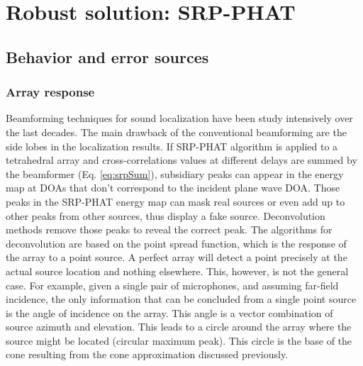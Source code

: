 \section{Robust solution: SRP-PHAT}
\subsection{Behavior and error sources}
\subsubsection{Array response}
Beamforming techniques for sound localization have been study intensively over the last decades. The main drawback of the conventional beamforming are the side lobes in the localization results. If SRP-PHAT algorithm is applied to a tetrahedral array and cross-correlations values at different delays are summed by the beamformer (Eq. \ref{eq:srpSum}), subsidiary peaks can appear in the energy map at DOAs that don't correspond to the incident plane wave DOA. Those peaks in the SRP-PHAT energy map can mask real sources or even add up to other peaks from other sources, thus display a fake source. Deconvolution methods remove those peaks to reveal the correct peak. The algorithms for deconvolution are based on the point spread function, which is the response of the array to a point source. 
A perfect array will detect a point precisely at the actual source location and nothing elsewhere. This, however, is not the general case. For example, given a single pair of microphones, and assuming far-field incidence, the only information that can be concluded from a single point source is the angle of incidence on the array. This angle is a vector combination of source azimuth and elevation. This leads to a circle around the array where the source might be located (circular maximum peak). This circle is the base of the cone resulting from the cone approximation discussed previously.

